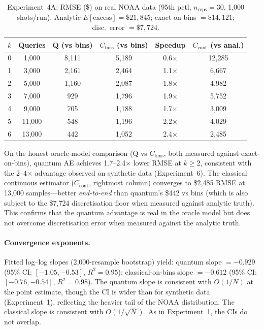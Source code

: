 \documentclass[11pt,a4paper]{article}
\begin{document}
\begin{table}[t]
\centering
\caption{Experiment~4A: RMSE (\$) on real NOAA data (95th pctl, $n_{\text{reps}}=30$, 1,000 shots/run). Analytic $E[\text{excess}] = \$21{,}845$; exact-on-bins $= \$14{,}121$; disc.\ error $= \$7{,}724$.}
\label{tab:exp4a}
\begin{tabular}{cccccc}
\toprule
$k$ & Queries & Q (vs bins) & $C_{\text{bins}}$ (vs bins) & Speedup & $C_{\text{cont}}$ (vs anal.) \\
\midrule
0 & 1,000 & 8,111 & 5,189 & 0.6$\times$ & 12,285 \\
1 & 3,000 & 2,161 & 2,464 & 1.1$\times$ & 6,667 \\
2 & 5,000 & 1,160 & 2,087 & 1.8$\times$ & 4,982 \\
3 & 7,000 & 929 & 1,796 & 1.9$\times$ & 5,752 \\
4 & 9,000 & 705 & 1,188 & 1.7$\times$ & 3,009 \\
5 & 11,000 & 548 & 1,196 & 2.2$\times$ & 4,029 \\
6 & 13,000 & 442 & 1,052 & 2.4$\times$ & 2,485 \\
\bottomrule
\end{tabular}
\end{table}

On the honest oracle-model comparison (Q vs $C_{\text{bins}}$, both measured against exact-on-bins), quantum AE achieves 1.7--2.4$\times$ lower RMSE at $k \geq 2$, consistent with the 2--4$\times$ advantage observed on synthetic data (Experiment~6). The classical continuous estimator ($C_{\text{cont}}$, rightmost column) converges to \$2,485 RMSE at 13,000 samples---better \emph{end-to-end} than quantum's \$442 vs bins (which is also subject to the \$7,724 discretisation floor when measured against analytic truth). This confirms that the quantum advantage is real in the oracle model but does not overcome discretisation error when measured against the analytic truth.

\paragraph{Convergence exponents.} Fitted log--log slopes (2,000-resample bootstrap) yield: quantum slope $= -0.929$ (95\% CI: $[-1.05, -0.53]$, $R^2 = 0.95$); classical-on-bins slope $= -0.612$ (95\% CI: $[-0.76, -0.54]$, $R^2 = 0.98$). The quantum slope is consistent with $O(1/N)$ at the point estimate, though the CI is wider than for synthetic data (Experiment~1), reflecting the heavier tail of the NOAA distribution. The classical slope is consistent with $O(1/\sqrt{N})$. As in Experiment~1, the CIs do not overlap.
\end{document}
